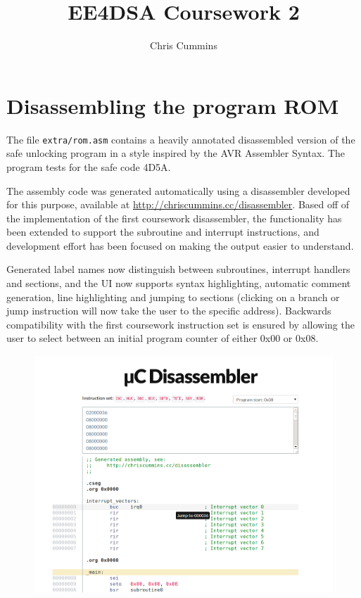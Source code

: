 \documentclass[12pt,a4paper]{article}
\title{EE4DSA Coursework 2}
\author{Chris Cummins}
\begin{document}
\maketitle

\section{Disassembling the program ROM}

The file \texttt{extra/rom.asm} contains a heavily annotated
disassembled version of the safe unlocking program in a style inspired
by the AVR Assembler Syntax. The program tests for the safe code 4D5A.

The assembly code was generated automatically using a disassembler
developed for this purpose, available at
\url{http://chriscummins.cc/disassembler}. Based off of the
implementation of the first coursework disassembler, the functionality
has been extended to support the subroutine and interrupt
instructions, and development effort has been focused on making the
output easier to understand.

Generated label names now distinguish between subroutines, interrupt
handlers and sections, and the UI now supports syntax highlighting,
automatic comment generation, line highlighting and jumping to
sections (clicking on a branch or jump instruction will now take the
user to the specific address). Backwards compatibility with the first
coursework instruction set is ensured by allowing the user to select
between an initial program counter of either 0x00 or 0x08.

\begin{figure}[H]
  \centering
  \includegraphics[width=6.4in]{assets/disassembler.png}
\end{figure}
\end{document}
